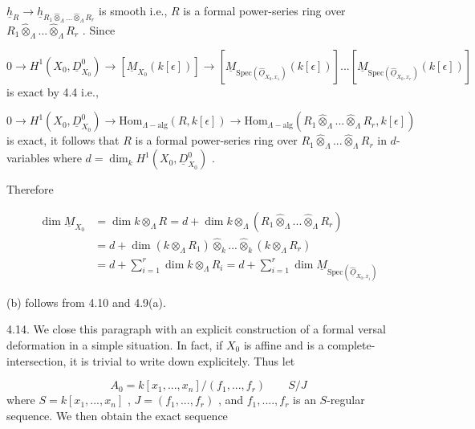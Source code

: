 $\underline{h}_R \to \underline{h}_{R_1 \widehat{\otimes}_\Lambda ... \widehat{\otimes}_\Lambda R_r}$   is smooth i.e.,  $R$  is a formal power-series ring over  $R_1 \widehat{\otimes}_\Lambda ... \widehat{\otimes}_\Lambda R_r$ . Since

\begin{equation*}
0 \to H^1(X_0,\underline{D}^0_{X_0}) \to [\underline{M}_{X_0}(k[\epsilon])] \to [\underline{M}_{\mathrm{Spec}(\widehat{\underline{O}}_{X_0,x_1})}(k[\epsilon])] ... [\underline{M}_{\mathrm{Spec}(\widehat{\underline{O}}_{X_0,x_r})}(k[\epsilon])]
\end{equation*}
is exact by 4.4 i.e.,

\begin{equation*}
0 \to H^1(X_0, \underline{D}^0_{X_0}) \to \mathrm{Hom}_{\Lambda-\mathrm{alg}}(R, k[\epsilon]) \to \mathrm{Hom}_{\Lambda-\mathrm{alg}}(R_1 \widehat{\otimes}_\Lambda ... \widehat{\otimes}_\Lambda R_r, k[\epsilon])
\end{equation*}
is exact, it follows that  $R$  is a formal power-series ring over    $R_1 \widehat{\otimes}_\Lambda ... \widehat{\otimes}_\Lambda R_r$ in $d$-variables where  $d = \dim_k H^1(X_0, \underline{D}^0_{X_0})$  .

Therefore

\begin{equation*}
\begin{aligned}
\dim \underline{M}_{X_0} &= \dim k \otimes_\Lambda R = d + \dim k \otimes_\Lambda (R_1 \widehat{\otimes}_\Lambda ... \widehat{\otimes}_\Lambda R_r) \\
&= d + \dim(k \otimes_\Lambda R_1) \widehat{\otimes}_k ... \widehat{\otimes}_k (k \otimes_\Lambda R_r) \\
&= d + \sum_{i=1}^{r} \dim k \otimes_\Lambda R_i = d + \sum_{i=1}^{r} \dim \underline{M}_{\mathrm{Spec}(\widehat{\underline{O}}_{X_0,x_i})}
\end{aligned}
\end{equation*}


(b)  follows from 4.10 and 4.9(a).

4.14.    We close this paragraph with an explicit construction of a formal versal deformation in a simple situation. In fact, if  $X_0$  is affine and is a complete-intersection, it is trivial to write down explicitely. Thus let

\begin{equation*}
A_0 = k[x_1,...,x_n]/(f_1,...,f_r) \qquad S/J
\end{equation*}
where  $S = k[x_1,...,x_n]$  ,  $J = (f_1,...,f_r)$  , and  $f_1,....,f_r$  is an $S$-regular sequence. We then obtain the exact sequence

